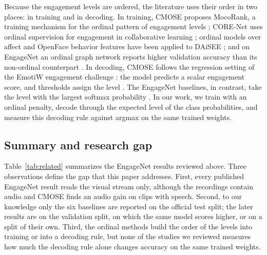 \documentclass[pdflatex,iicol,sn-basic]{sn-jnl}
\begin{document}
Because the engagement levels are ordered, the literature uses their order in two places: in training and in decoding. In training, CMOSE proposes MocoRank, a training mechanism for the ordinal pattern of engagement levels \citep{wu2024cmose}; CORE-Net uses ordinal supervision for engagement in collaborative learning \citep{tran2026ordinal}; ordinal models over affect and OpenFace behavior features have been applied to DAiSEE \citep{abedi2024affect,safa2025sclordinal}; and on EngageNet an ordinal graph network reports higher validation accuracy than its non-ordinal counterpart \citep{abedi2024stgcn}. In decoding, CMOSE follows the regression setting of the EmotiW engagement challenge \citep{dhall2020emotiw}: the model predicts a scalar engagement score, and thresholds assign the level \citep{wu2024cmose}. The EngageNet baselines, in contrast, take the level with the largest softmax probability \citep{singh2023engagenet}. In our work, we train with an ordinal penalty, decode through the expected level of the class probabilities, and measure this decoding rule against argmax on the same trained weights.

\subsection{Summary and research gap}\label{sec:rw_gap}

Table~\ref{tab:related} summarizes the EngageNet results reviewed above. Three observations define the gap that this paper addresses. First, every published EngageNet result reads the visual stream only, although the recordings contain audio and CMOSE finds an audio gain on clips with speech. Second, to our knowledge only the six baselines are reported on the official test split; the later results are on the validation split, on which the same model scores higher, or on a split of their own. Third, the ordinal methods build the order of the levels into training or into a decoding rule, but none of the studies we reviewed measures how much the decoding rule alone changes accuracy on the same trained weights.
\end{document}
